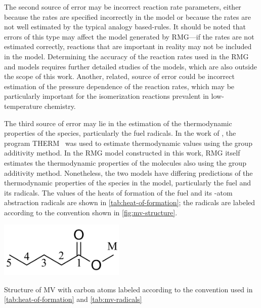 \documentclass[letterpaper, review, sort&compress]{elsarticle}
\begin{document}
The second source of error may be incorrect reaction rate parameters, either because the rates are
specified incorrectly in the model or because the rates are not well estimated by the
typical analogy based-rules. It should be noted that errors of this type may affect the model
generated by RMG---if the rates are not estimated correctly, reactions that are important in reality
may not be included in the model. Determining the accuracy of the reaction rates used in the RMG and
\citet{Dievart2013} models requires further detailed studies of the models, which are also outside
the scope of this work. Another, related, source of error could be incorrect estimation of the
pressure dependence of the reaction rates, which may be particularly important for the isomerization
reactions prevalent in low-temperature chemistry.

The third source of error may lie in the estimation of the thermodynamic properties of the species,
particularly the fuel radicals. In the work of \citet{Dievart2013}, the program
THERM~\cite{Ritter1991} was used to estimate thermodynamic values using the group additivity method.
In the RMG model constructed in this work, RMG itself estimates the thermodynamic properties of the
molecules also using the group additivity method. Nonetheless, the two models have differing
predictions of the thermodynamic properties of the species in the model, particularly the fuel and
its radicals. The values of the heats of formation of the fuel and its -atom abstraction
radicals are shown in \cref{tab:heat-of-formation}; the radicals are labeled according to the
convention shown in \cref{fig:mv-structure}.

\begin{center}
    \captionsetup{type=figure}
    \includegraphics[width=60mm]{figures/Methyl_pentanoate.png}
    \caption{Structure of MV with carbon atoms labeled according to the convention used in
    \cref{tab:heat-of-formation} and \cref{tab:mv-radicals}}
    \label{fig:mv-structure}
\end{center}
\end{document}
